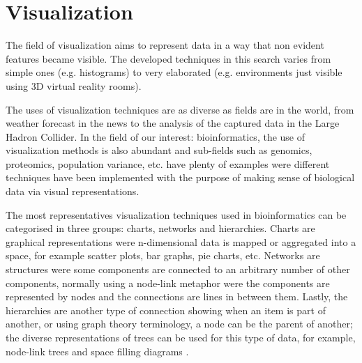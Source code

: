 \newpage
\section{Visualization}
The field of visualization aims to represent data in a way that non evident features became visible. The developed techniques in this search varies from simple ones (e.g. histograms) to very elaborated (e.g. environments just visible using 3D virtual reality rooms).

The uses of visualization techniques are as diverse as fields are in the world, from weather forecast in the news to the analysis of the captured data in the Large Hadron Collider. In the field of our interest: bioinformatics, the use of visualization methods is also abundant and sub-fields such as genomics, proteomics, population variance, etc. have plenty of examples were different techniques have been implemented with the purpose of making sense of biological data via visual representations.


The most representatives visualization techniques used in bioinformatics can be categorised in three groups: charts, networks and hierarchies. Charts are graphical representations were n-dimensional data is mapped or aggregated into a space, for example scatter plots, bar graphs, pie charts, etc. Networks are structures were some components are connected to an arbitrary number of other components, normally using a node-link metaphor were the components are represented by nodes and the connections are lines in between them. Lastly, the hierarchies are another type of connection showing when an item is part of another, or using graph theory terminology, a node can be the parent of another; the diverse representations of trees can be used for this type of data, for example, node-link trees and space filling diagrams \cite{WAN2014}. 

